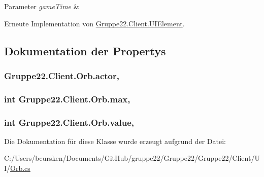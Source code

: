 \begin{DoxyParams}{Parameter}
{\em game\-Time} & \\
\hline
\end{DoxyParams}


Erneute Implementation von \hyperlink{class_gruppe22_1_1_client_1_1_u_i_element_a456bc763b6ed6ab441bb0ae96b6f4f8b}{Gruppe22.\-Client.\-U\-I\-Element}.



\subsection{Dokumentation der Propertys}
\hypertarget{class_gruppe22_1_1_client_1_1_orb_a4e41fb8ca80e0e571c81667475c43d70}{
\subsubsection[{actor}]{ Gruppe22.\-Client.\-Orb.\-actor\hspace{0.3cm}{\ttfamily [get]}, {\ttfamily [set]}}}\label{class_gruppe22_1_1_client_1_1_orb_a4e41fb8ca80e0e571c81667475c43d70}
\hypertarget{class_gruppe22_1_1_client_1_1_orb_ab6d555ddf688d3bb1faae3e6a2f6dfed}{
\subsubsection[{max}]{\setlength{\rightskip}{0pt plus 5cm}int Gruppe22.\-Client.\-Orb.\-max\hspace{0.3cm}{\ttfamily [get]}, {\ttfamily [set]}}}\label{class_gruppe22_1_1_client_1_1_orb_ab6d555ddf688d3bb1faae3e6a2f6dfed}
\hypertarget{class_gruppe22_1_1_client_1_1_orb_a7ed4893141f482fed4ec625869b87802}{
\subsubsection[{value}]{\setlength{\rightskip}{0pt plus 5cm}int Gruppe22.\-Client.\-Orb.\-value\hspace{0.3cm}{\ttfamily [get]}, {\ttfamily [set]}}}\label{class_gruppe22_1_1_client_1_1_orb_a7ed4893141f482fed4ec625869b87802}


Die Dokumentation für diese Klasse wurde erzeugt aufgrund der Datei\-:\begin{DoxyCompactItemize}
\item 
C\-:/\-Users/beursken/\-Documents/\-Git\-Hub/gruppe22/\-Gruppe22/\-Gruppe22/\-Client/\-U\-I/\hyperlink{_orb_8cs}{Orb.\-cs}\end{DoxyCompactItemize}
